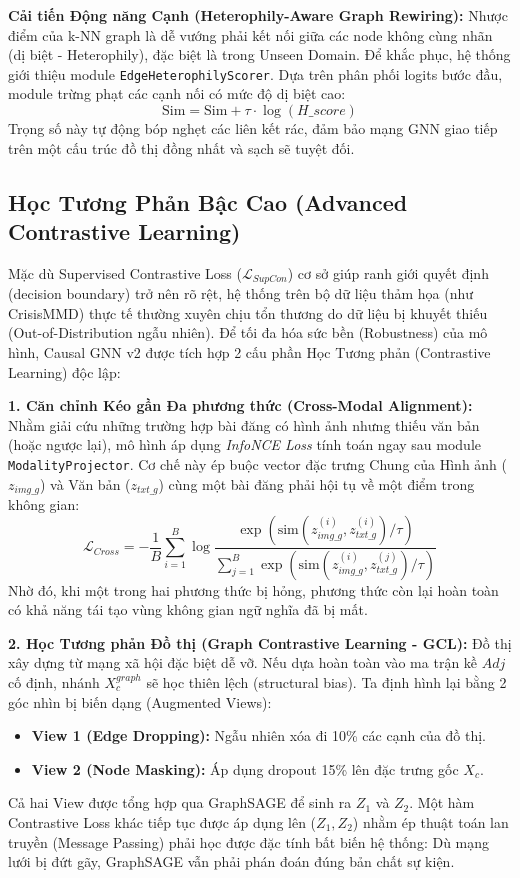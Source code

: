 \documentclass[11pt,a4paper]{article}
\begin{document}
\textbf{Cải tiến Động năng Cạnh (Heterophily-Aware Graph Rewiring):}
Nhược điểm của k-NN graph là dễ vướng phải kết nối giữa các node không cùng nhãn (dị biệt - Heterophily), đặc biệt là trong Unseen Domain. Để khắc phục, hệ thống giới thiệu module \texttt{EdgeHeterophilyScorer}. Dựa trên phân phối logits bước đầu, module trừng phạt các cạnh nối có mức độ dị biệt cao:
\begin{equation}
\text{Sim} = \text{Sim} + \tau \cdot \log(H\_score)
\end{equation}
Trọng số này tự động bóp nghẹt các liên kết rác, đảm bảo mạng GNN giao tiếp trên một cấu trúc đồ thị đồng nhất và sạch sẽ tuyệt đối.

\subsection{Học Tương Phản Bậc Cao (Advanced Contrastive Learning)}
Mặc dù Supervised Contrastive Loss ($\mathcal{L}_{SupCon}$) cơ sở giúp ranh giới quyết định (decision boundary) trở nên rõ rệt, hệ thống trên bộ dữ liệu thảm họa (như CrisisMMD) thực tế thường xuyên chịu tổn thương do dữ liệu bị khuyết thiếu (Out-of-Distribution ngẫu nhiên). Để tối đa hóa sức bền (Robustness) của mô hình, Causal GNN v2 được tích hợp 2 cấu phần Học Tương phản (Contrastive Learning) độc lập:

\textbf{1. Căn chỉnh Kéo gần Đa phương thức (Cross-Modal Alignment):}
Nhằm giải cứu những trường hợp bài đăng có hình ảnh nhưng thiếu văn bản (hoặc ngược lại), mô hình áp dụng \textit{InfoNCE Loss} tính toán ngay sau module \texttt{ModalityProjector}. Cơ chế này ép buộc vector đặc trưng Chung của Hình ảnh ($z_{img\_g}$) và Văn bản ($z_{txt\_g}$) cùng một bài đăng phải hội tụ về một điểm trong không gian:
\begin{equation}
\mathcal{L}_{Cross} = -\frac{1}{B} \sum_{i=1}^{B} \log \frac{\exp(\text{sim}(z_{img\_g}^{(i)}, z_{txt\_g}^{(i)}) / \tau)}{\sum_{j=1}^{B} \exp(\text{sim}(z_{img\_g}^{(i)}, z_{txt\_g}^{(j)}) / \tau)}
\end{equation}
Nhờ đó, khi một trong hai phương thức bị hỏng, phương thức còn lại hoàn toàn có khả năng tái tạo vùng không gian ngữ nghĩa đã bị mất.

\textbf{2. Học Tương phản Đồ thị (Graph Contrastive Learning - GCL):}
Đồ thị xây dựng từ mạng xã hội đặc biệt dễ vỡ. Nếu dựa hoàn toàn vào ma trận kề $Adj$ cố định, nhánh $X_c^{graph}$ sẽ học thiên lệch (structural bias). Ta định hình lại bằng 2 góc nhìn bị biến dạng (Augmented Views):
\begin{itemize}
    \item \textbf{View 1 (Edge Dropping):} Ngẫu nhiên xóa đi 10\% các cạnh của đồ thị.
    \item \textbf{View 2 (Node Masking):} Áp dụng dropout 15\% lên đặc trưng gốc $X_c$.
\end{itemize}
Cả hai View được tổng hợp qua GraphSAGE để sinh ra $Z_1$ và $Z_2$. Một hàm Contrastive Loss khác tiếp tục được áp dụng lên ($Z_1, Z_2$) nhằm ép thuật toán lan truyền (Message Passing) phải học được đặc tính bất biến hệ thống: Dù mạng lưới bị đứt gãy, GraphSAGE vẫn phải phán đoán đúng bản chất sự kiện.
\end{document}
